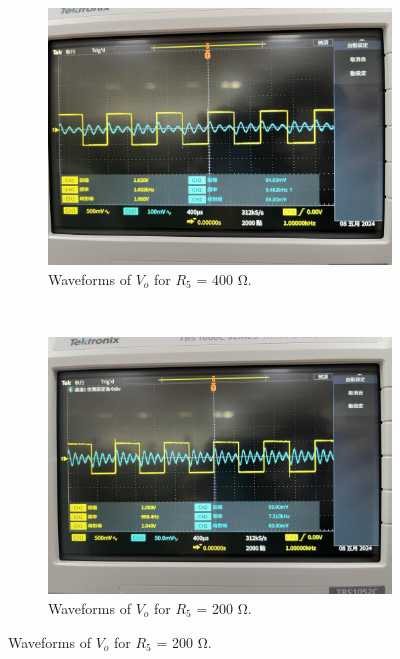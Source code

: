 \documentclass{article}
\begin{document}
\begin{CJK*}{UTF8}{bkai}
\begin{figure}[h]
    \begin{center}
        \begin{subfigure}[b]{0.45\textwidth}
            \includegraphics[width=\textwidth]{5th_harmonic.jpg}
            \caption*{Waveforms of $V_o$ for $R_5$ = 400 \unit{\ohm}.}
        \end{subfigure}
        ~
        \begin{subfigure}[b]{0.45\textwidth}
            \includegraphics[width=\textwidth]{7th_harmonic.jpg}
            \caption*{Waveforms of $V_o$ for $R_5$ = 200 \unit{\ohm}.}
        \end{subfigure}
    \end{center}
\end{figure}


\end{CJK*}
\end{document}
